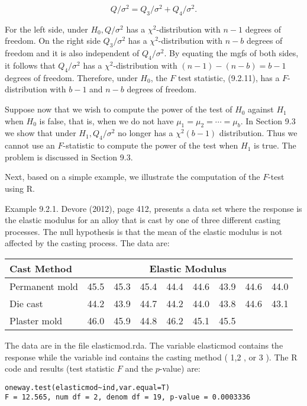 $$
Q / \sigma^{2}=Q_{3} / \sigma^{2}+Q_{4} / \sigma^{2} .
$$

For the left side, under $H_{0}, Q / \sigma^{2}$ has a $\chi^{2}$-distribution with $n-1$ degrees of freedom. On the right side $Q_{3} / \sigma^{2}$ has a $\chi^{2}$-distribution with $n-b$ degrees of freedom and it is also independent of $Q_{4} / \sigma^{2}$. By equating the mgfs of both sides, it follows that $Q_{4} / \sigma^{2}$ has a $\chi^{2}$-distribution with $(n-1)-(n-b)=b-1$ degrees of freedom. Therefore, under $H_{0}$, the $F$ test statistic, (9.2.11), has a $F$-distribution with $b-1$ and $n-b$ degrees of freedom.

Suppose now that we wish to compute the power of the test of $H_{0}$ against $H_{1}$ when $H_{0}$ is false, that is, when we do not have $\mu_{1}=\mu_{2}=\cdots=\mu_{b}$. In Section 9.3 we show that under $H_{1}, Q_{4} / \sigma^{2}$ no longer has a $\chi^{2}(b-1)$ distribution. Thus we cannot use an $F$-statistic to compute the power of the test when $H_{1}$ is true. The problem is discussed in Section 9.3.

Next, based on a simple example, we illustrate the computation of the $F$-test using R.

Example 9.2.1. Devore (2012), page 412, presents a data set where the response is the elastic modulus for an alloy that is cast by one of three different casting processes. The null hypothesis is that the mean of the elastic modulus is not affected by the casting process. The data are:

\begin{center}
\begin{tabular}{|l|c|c|c|c|c|c|c|c|}
\hline
Cast Method & \multicolumn{8}{|c|}{Elastic Modulus} \\
\hline
Permanent mold & 45.5 & 45.3 & 45.4 & 44.4 & 44.6 & 43.9 & 44.6 & 44.0 \\
\hline
Die cast & 44.2 & 43.9 & 44.7 & 44.2 & 44.0 & 43.8 & 44.6 & 43.1 \\
\hline
Plaster mold & 46.0 & 45.9 & 44.8 & 46.2 & 45.1 & 45.5 &  &  \\
\hline
\end{tabular}
\end{center}

The data are in the file elasticmod.rda. The variable elasticmod contains the response while the variable ind contains the casting method ( 1,2 , or 3 ). The R code and results (test statistic $F$ and the $p$-value) are:

\begin{verbatim}
oneway.test(elasticmod~ind,var.equal=T)
F = 12.565, num df = 2, denom df = 19, p-value = 0.0003336
\end{verbatim}

